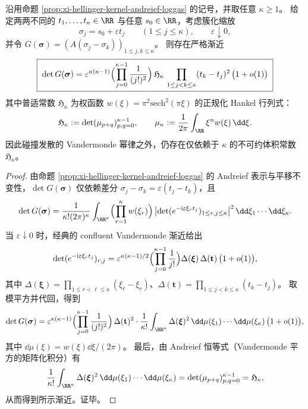 \begin{theorem}\label{thm:xi-hellinger-gram-collision-hankel-constant}
沿用命题 \ref{prop:xi-hellinger-kernel-andreief-loggas} 的记号，并取任意 \(\kappa\ge 1\)。
给定两两不同的 \(t_1,\dots,t_\kappa\in\RR\) 与任意 \(s_0\in\RR\)，考虑簇化缩放
\[
\sigma_j=s_0+\varepsilon t_j\qquad(1\le j\le \kappa),\qquad \varepsilon\downarrow 0,
\]
并令 \(G(\boldsymbol{\sigma})=(A(\sigma_j-\sigma_k))_{1\le j,k\le\kappa}\)。
则存在严格渐近
\[
\boxed{\;
\det G(\boldsymbol{\sigma})
=\varepsilon^{\kappa(\kappa-1)}
\Bigl(\prod_{j=0}^{\kappa-1}\frac{1}{(j!)^{2}}\Bigr)\,
\mathfrak H_\kappa\,
\prod_{1\le j<k\le\kappa}(t_k-t_j)^{2}\,\bigl(1+o(1)\bigr)\;}
\]
其中普适常数 \(\mathfrak H_\kappa\) 为权函数 \(w(\xi)=\pi^{2}\mathrm{sech}^{2}(\pi\xi)\) 的正规化 Hankel 行列式：
\[
\mathfrak H_\kappa:=\det(\mu_{p+q})_{p,q=0}^{\kappa-1},\qquad
\mu_n:=\frac{1}{2\pi}\int_{\RR}\xi^{n}w(\xi)\,\dd\xi.
\]
因此碰撞发散的 Vandermonde 幂律之外，仍存在仅依赖于 \(\kappa\) 的不可约体积常数 \(\mathfrak H_\kappa\)。
\end{theorem}
\begin{proof}
由命题 \ref{prop:xi-hellinger-kernel-andreief-loggas} 的 Andreief 表示与平移不变性，\(\det G(\boldsymbol{\sigma})\) 仅依赖差分 \(\sigma_j-\sigma_k=\varepsilon(t_j-t_k)\)，且
\[
\det G(\boldsymbol{\sigma})
=\frac{1}{\kappa!(2\pi)^{\kappa}}
\int_{\RR^\kappa}\Bigl(\prod_{r=1}^{\kappa}w(\xi_r)\Bigr)\,
\bigl|\det(e^{-\mathrm{i}\varepsilon\xi_r t_j})_{1\le r,j\le\kappa}\bigr|^{2}\,\dd\xi_1\cdots\dd\xi_\kappa.
\]
当 \(\varepsilon\downarrow 0\) 时，经典的 confluent Vandermonde 渐近给出
\[
\det(e^{-\mathrm{i}\varepsilon\xi_r t_j})_{r,j}
=\varepsilon^{\kappa(\kappa-1)/2}\Bigl(\prod_{j=0}^{\kappa-1}\frac{1}{j!}\Bigr)
\Delta(\boldsymbol{\xi})\,\Delta(\mathbf t)\,\bigl(1+o(1)\bigr),
\]
其中 \(\Delta(\boldsymbol{\xi})=\prod_{1\le r<\ell\le\kappa}(\xi_\ell-\xi_r)\)、\(\Delta(\mathbf t)=\prod_{1\le j<k\le\kappa}(t_k-t_j)\)。
取模平方并代回，得到
\[
\det G(\boldsymbol{\sigma})
=\varepsilon^{\kappa(\kappa-1)}\Bigl(\prod_{j=0}^{\kappa-1}\frac{1}{(j!)^{2}}\Bigr)\,
\Delta(\mathbf t)^{2}\cdot
\frac{1}{\kappa!}\int_{\RR^\kappa}\Delta(\boldsymbol{\xi})^{2}\,\dd\mu(\xi_1)\cdots\dd\mu(\xi_\kappa)\,\bigl(1+o(1)\bigr),
\]
其中 \(\dd\mu(\xi)=w(\xi)\dd\xi/(2\pi)\)。
最后，由 Andreief 恒等式（Vandermonde 平方的矩阵化积分）有
\[
\frac{1}{\kappa!}\int_{\RR^\kappa}\Delta(\boldsymbol{\xi})^{2}\,\dd\mu(\xi_1)\cdots\dd\mu(\xi_\kappa)
=\det(\mu_{p+q})_{p,q=0}^{\kappa-1}=\mathfrak H_\kappa,
\]
从而得到所示渐近。证毕。
\end{proof}

